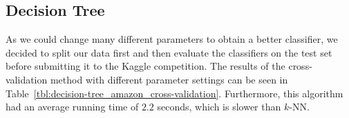\documentclass[a4paper,11pt]{article}
\begin{document}
        
    \subsection{Decision Tree}
        As we could change many different parameters to obtain a better classifier, we decided to split our data first and then evaluate the classifiers on the test set before submitting it to the Kaggle competition. The results of the cross-validation method with different parameter settings can be seen in Table~\ref{tbl:decision-tree_amazon_cross-validation}. Furthermore, this algorithm had an average running time of $2.2$ seconds, which is slower than $k$-NN. 
    
        
        
\end{document}
